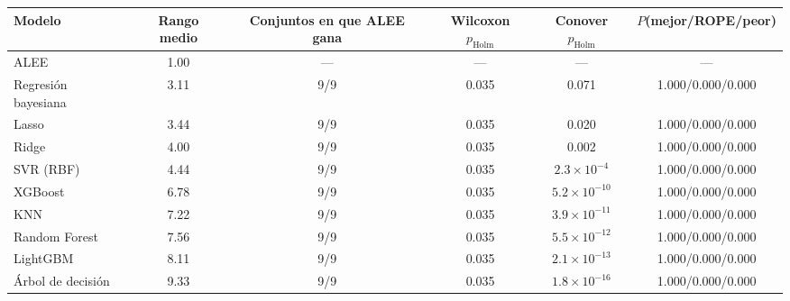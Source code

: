 \begin{tabular}{lccccc}
\toprule
Modelo & Rango medio & Conjuntos en que ALEE gana & Wilcoxon $p_{\mathrm{Holm}}$ & Conover $p_{\mathrm{Holm}}$ & $P$(mejor/ROPE/peor) \\
\midrule
ALEE & 1.00 & --- & --- & --- & --- \\
\midrule
Regresión bayesiana & 3.11 & 9/9 & 0.035 & 0.071 & 1.000/0.000/0.000 \\
Lasso & 3.44 & 9/9 & 0.035 & 0.020 & 1.000/0.000/0.000 \\
Ridge & 4.00 & 9/9 & 0.035 & 0.002 & 1.000/0.000/0.000 \\
SVR (RBF) & 4.44 & 9/9 & 0.035 & $2.3\times10^{-4}$ & 1.000/0.000/0.000 \\
XGBoost & 6.78 & 9/9 & 0.035 & $5.2\times10^{-10}$ & 1.000/0.000/0.000 \\
KNN & 7.22 & 9/9 & 0.035 & $3.9\times10^{-11}$ & 1.000/0.000/0.000 \\
Random Forest & 7.56 & 9/9 & 0.035 & $5.5\times10^{-12}$ & 1.000/0.000/0.000 \\
LightGBM & 8.11 & 9/9 & 0.035 & $2.1\times10^{-13}$ & 1.000/0.000/0.000 \\
Árbol de decisión & 9.33 & 9/9 & 0.035 & $1.8\times10^{-16}$ & 1.000/0.000/0.000 \\
\bottomrule
\end{tabular}